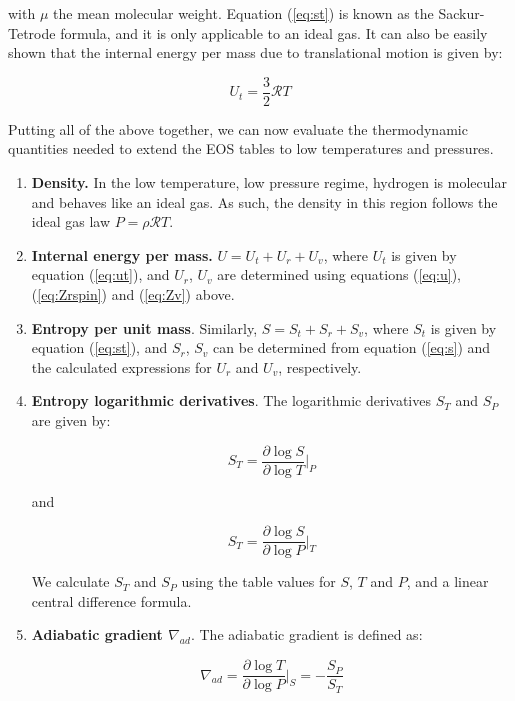 \documentclass[apj]{emulateapj}
\begin{document}
\noindent with $\mu$ the mean molecular weight. Equation (\ref{eq:st}) is known as the Sackur-Tetrode formula, and it is only applicable to an ideal gas. It can also be easily shown that the internal energy per mass due to translational motion is given by:

\begin{equation}
\label{eq:ut}
U_t=\frac{3}{2} \mathcal{R} T
\end{equation}

Putting all of the above together, we can now evaluate the thermodynamic quantities needed to extend the \cite{saumon95} EOS tables to low temperatures and pressures.

\begin{enumerate}

\item{\textbf{Density.}} In the low temperature, low pressure regime, hydrogen is molecular and behaves like an ideal gas. As such, the density in this region follows the ideal gas law $P=\rho \mathcal{R} T$.
\item{\textbf{Internal energy per mass.}} $U=U_t+U_r+U_v$, where $U_t$ is given by equation (\ref{eq:ut}), and $U_r$, $U_v$ are determined using equations (\ref{eq:u}), (\ref{eq:Zrspin}) and (\ref{eq:Zv}) above.
\item{\textbf{Entropy per unit mass}}. Similarly, $S=S_t+S_r+S_v$, where $S_t$ is given by equation (\ref{eq:st}), and $S_r$, $S_v$ can be determined from equation (\ref{eq:s}) and the calculated expressions for $U_r$ and $U_v$, respectively.
\item{\textbf{Entropy logarithmic derivatives}}. The logarithmic derivatives $S_T$ and $S_P$ are given by:

\begin{equation}
\label{eq:sT}
S_T=\frac{\partial \log{S}}{\partial \log{T}} \Big |_P
\end{equation}

\noindent and

\begin{equation}
\label{eq:sP}
S_T=\frac{\partial \log{S}}{\partial \log{P}} \Big |_T
\end{equation}

We calculate $S_T$ and $S_P$ using the table values for $S$, $T$ and $P$, and a linear central difference formula. 

\item{\textbf{Adiabatic gradient $\nabla_{ad}$}}. The adiabatic gradient is defined as:

\begin{equation}
\label{eq:deladSP}
\nabla_{ad}=\frac{\partial \log{T}}{\partial \log{P}} \Big |_S = -\frac{S_P}{S_T}
\end{equation}


\end{enumerate}
\end{document}
